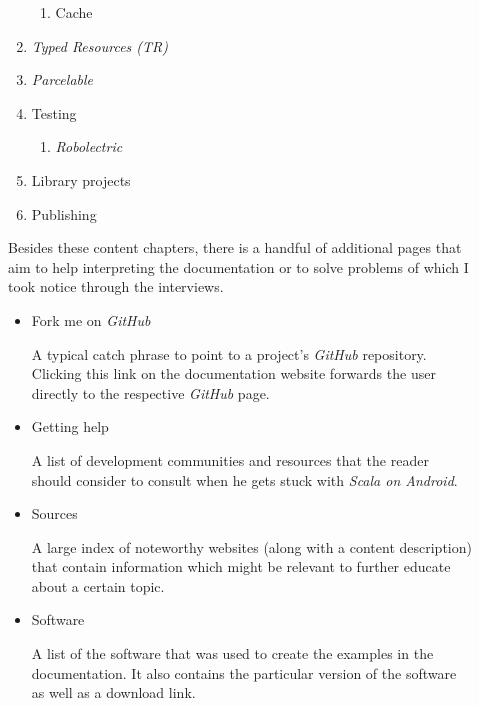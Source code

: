 \begin{description}
\begin{enumerate}
\begin{enumerate}
			\item Cache

		\end{enumerate}

		\item \textit{Typed Resources (TR)}

		\item \textit{Parcelable}

		\item Testing

		\begin{enumerate}

			\item \textit{Robolectric}

		\end{enumerate}

		\item Library projects

		\item Publishing

	\end{enumerate}

	Besides these content chapters, there is a handful of additional pages that aim to help interpreting the documentation or to solve problems of which I took notice through the interviews.

	\begin{itemize}

		\item Fork me on \textit{GitHub}

		A typical catch phrase to point to a project's \textit{GitHub} repository. Clicking this link on the documentation website forwards the user directly to the respective \textit{GitHub} page.

		\item Getting help

		A list of development communities and resources that the reader should consider to consult when he gets stuck with \textit{Scala on Android}.

		\item Sources

		A large index of noteworthy websites (along with a content description) that contain information which might be relevant to further educate about a certain topic.

		\item Software

		A list of the software that was used to create the examples in the documentation. It also contains the particular version of the software as well as a download link.


\end{itemize}
\end{description}
